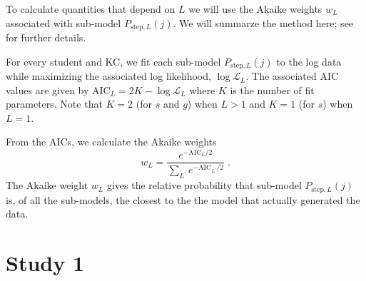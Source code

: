 \documentclass{edm_template}
\begin{document}
To calculate quantities that depend on $L$ we will use the
Akaike weights $w_L$  \cite{burnham_model_2002} associated with sub-model
$P_{\mathrm{step},L}(j)$.  We will summarze the
method here; see~\cite{van_de_sande_measuring_2013}  for further
details.

For every student and KC, we fit each sub-model $P_{\mathrm{step},L}(j)$ to the
 log data while maximizing the associated log likelihood, $\log\mathcal{L}_L$.  The associated
AIC values are given by $\mathrm{AIC}_L=2 K-\log \mathcal{L}_L$ where
$K$ is the number of fit parameters.  Note that $K=2$  (for $s$ and
$g$) when $L>1$ and $K=1$ (for $s$) when $L=1$.

From the AICs, we calculate 
the Akaike weights
%
\begin{equation}
     w_L=\frac{e^{-\mathrm{AIC}_L/2} }{\sum_{L^\prime}
       e^{-\mathrm{AIC}_{L^\prime}/2}} \; .
\end{equation}
%
The Akaike weight $w_L$ gives the relative probability that sub-model 
$P_{\mathrm{step},L}(j)$ is, of all the sub-models, the closest to the 
the model that actually generated the data.

\section{Study 1}
\end{document}
